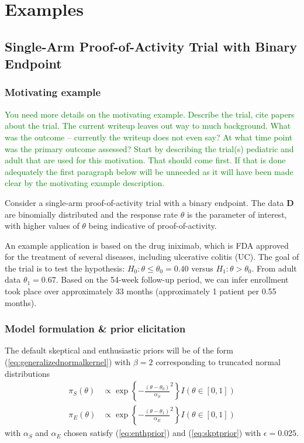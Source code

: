 \documentclass[12pt]{article}
\begin{document}

\section{Examples}

\subsection{Single-Arm Proof-of-Activity Trial with Binary Endpoint}
\subsubsection{Motivating example}
\textcolor{green}{You need more details on the motivating example. Describe the trial, cite papers about the trial. 
%
The current writeup leaves out way to much background.
%
What was the outcome -- currently the writeup does not even say? At what time point was the primary outcome assessed?
%
Start by describing the trial(s) pediatric and adult that are used for this motivation. 
%
That should come first. If that is done adequately the first paragraph below will be unneeded as it will have been made clear by the motivating example description.
}

Consider a single-arm proof-of-activity trial with a binary endpoint. The data $\mathbf{D}$ are binomially distributed and the response rate $\theta$ is the parameter of interest, with higher values of $\theta$ being indicative of proof-of-activity. 

An example application is based on the drug iniximab, which is FDA approved for the treatment of several diseases, including ulcerative colitis (UC). The goal of the trial is to test the hypothesis: $H_0:\theta\leq\theta_0=0.40$ versus $H_1:\theta>\theta_0$. From adult data $\theta_1=0.67$. Based on the 54-week follow-up period, we can infer enrollment took place over approximately 33 months (approximately 1 patient per 0.55 months).

\subsubsection{Model formulation \& prior elicitation}
The default skeptical and enthusiastic priors will be of the form (\ref{eq:generalizednormalkernel}) with $\beta=2$ corresponding to truncated normal distributions
\begin{align}
\pi_S(\theta)&\propto \exp\left\{-\frac{(\theta-\theta_0)}{\alpha_S}^2\right\} I(\theta\in[0,1])\\
\pi_E(\theta)&\propto \exp\left\{-\frac{(\theta-\theta_1)}{\alpha_E}^2\right\} I(\theta\in[0,1])
\end{align}
with $\alpha_S$ and $\alpha_E$ chosen satisfy (\ref{eq:enthprior}) and (\ref{eq:skptprior}) with $\epsilon=0.025$.
\end{document}
